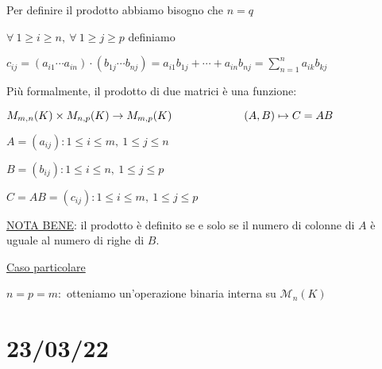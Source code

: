 \documentclass{article}
\newcommand{\ul}[1]{\underline{#1}}
\newcommand{\M}{\mathcal{M}}
\begin{document}
{\begin{itemize}
	      Per definire il prodotto abbiamo bisogno che $n=q$

	      $\forall\ 1\ge i\ge n,\ \forall\ 1\ge j\ge p$ definiamo

	      $c_{ij}=(a_{i1}\cdots a_{in})\cdot(b_{1j}\cdots b_{nj})=a_{i1}b_{1j}+\cdots+a_{in}b_{nj}=\sum^n_{n=1}{a_{ik}b_{kj}}$

	      Più formalmente, il prodotto di due matrici è una funzione:

	      $M_{m,n}(K)\times M_{n,p}(K)\rightarrow M_{m,p}(K)\\\hspace*{6.5em}(A,B)\mapsto C=AB$

	      $A=(a_{ij}): 1\le i\le m,\ 1\le j\le n$

	      $B=(b_{ij}): 1\le i\le n,\ 1\le j\le p$

	      $C=AB=(c_{ij}): 1\le i\le m,\ 1\le j\le p$

	      \ul{NOTA BENE}: il prodotto è definito se e solo se il numero di colonne di $A$ è uguale al numero di righe di $B$.

	      \ul{Caso particolare}

	      $n=p=m:$ otteniamo un'operazione binaria interna su $\M_n(K)$
\end{itemize}
}
\section{23/03/22}
\end{document}
